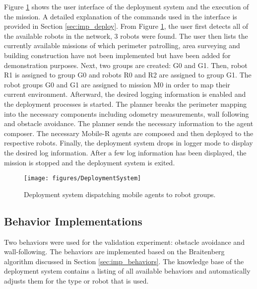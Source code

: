     Figure \ref{fig:deploymentsystem} shows the user interface of the 
      deployment system and the execution of the mission.
    A detailed explanation of the commands used in the interface is provided in 
      Section \ref{sec:imp_deploy}.
    From Figure \ref{fig:deploymentsystem}, the user first detects all of the
      available robots in the network, 3 robots were found.
    The user then lists the currently available missions of which perimeter
      patrolling, area surveying and building construction have not been
      implemented but have been added for demonstration purposes.
    Next, two groups are created: G0 and G1.
    Then, robot R1 is assigned to group G0 and robots R0 and R2 are assigned 
      to group G1.
    The robot groups G0 and G1 are assigned to mission M0 in order to map
      their current environment.
    Afterward, the desired logging information is enabled and the deployment 
      processes is started.
    The planner breaks the perimeter mapping into the necessary components 
      including odometry measurements, wall following and obstacle avoidance.
    The planner sends the necessary information to the agent composer.
    The necessary Mobile-R agents are composed and then deployed to the
      respective robots. 
    Finally, the deployment system drops in logger mode to display the desired
      log information.
    After a few log information has been displayed, the mission is stopped and 
      the deployment system is exited.
    \begin{figure}%
     \centerline{\texttt{[image: figures/DeploymentSystem]}}
     \caption{Deployment system dispatching mobile agents to robot groups.}
     \label{fig:deploymentsystem}
    \end{figure}


    \subsection{Behavior Implementations} \label{sec:val_behavior}
      Two behaviors were used for the validation experiment: obstacle avoidance
        and wall-following.
      The behaviors are implemented based on the Braitenberg algorithm discussed
        in Section \ref{sec:imp_behaviors}.
      The knowledge base of the deployment system contains a listing of all 
        available behaviors and automatically adjusts them for the type or robot
        that is used.
    
